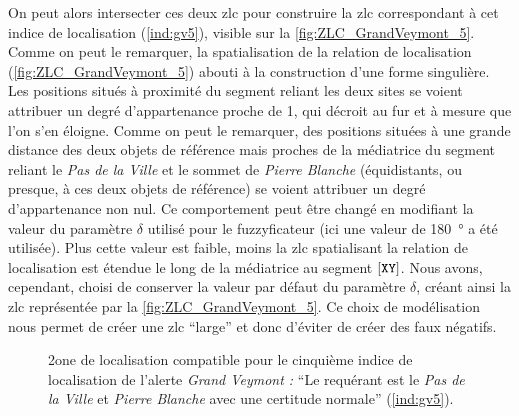 On peut alors intersecter ces deux \ac{zlc} pour construire la
\ac{zlc} correspondant à cet indice de localisation (\ref{ind:gv5}),
visible sur la \autoref{fig:ZLC_GrandVeymont_5}. Comme on peut le
remarquer, la spatialisation de la relation de localisation
 (\autoref{fig:ZLC_GrandVeymont_5}) abouti
à la construction d'une forme singulière. Les positions situés à
proximité du segment reliant les deux sites se voient attribuer un
degré d'appartenance proche de 1, qui décroit au fur et à mesure que
l'on s'en éloigne. Comme on peut le remarquer, des positions situées à
une grande distance des deux objets de référence mais proches de la
médiatrice du segment reliant le \emph{Pas de la Ville} et le sommet
de \emph{Pierre Blanche} (\ie équidistants, ou presque, à ces deux
objets de référence) se voient attribuer un degré d'appartenance non
nul. Ce comportement peut être changé en modifiant la valeur du
paramètre \(\delta\) utilisé pour le fuzzyficateur
 (ici une valeur de \SI{180}{\degree} a été
utilisée). Plus cette valeur est faible, moins la \ac{zlc}
spatialisant la relation de localisation 
est étendue le long de la médiatrice au segment
$[\text{\texttt{XY}}]$. Nous avons, cependant, choisi de conserver la
valeur par défaut du paramètre \(\delta\), créant ainsi la \ac{zlc}
représentée par la \autoref{fig:ZLC_GrandVeymont_5}. Ce choix de
modélisation nous permet de créer une \ac{zlc} \enquote{large} et donc
d'éviter de créer des faux négatifs.

\begin{figure}
  \centering
  
  \caption{2one de localisation compatible pour le cinquième indice de
    localisation de l'alerte \emph{Grand Veymont :} \enquote{Le
      requérant est \protect{} le \emph{Pas
        de la Ville} et \emph{Pierre Blanche} avec une certitude
      normale} (\ref{ind:gv5}).}
  \label{fig:ZLC_GrandVeymont_5}
\end{figure}


